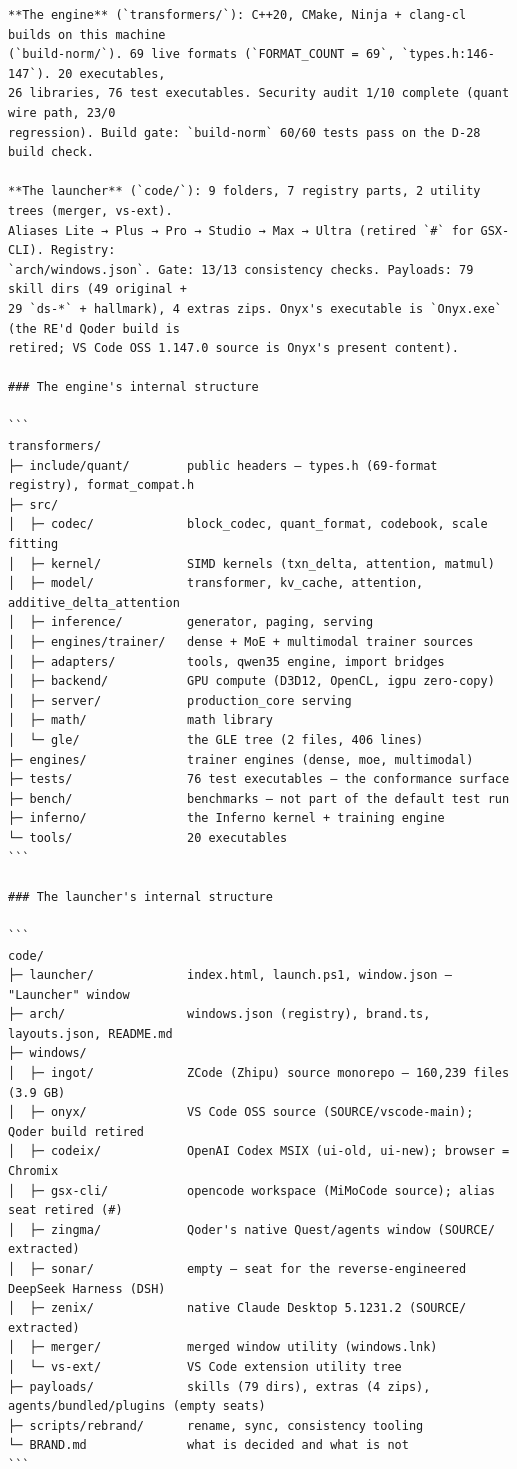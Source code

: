 \begin{Verbatim}[breaklines,breakanywhere,fontsize=\footnotesize]
**The engine** (`transformers/`): C++20, CMake, Ninja + clang-cl builds on this machine
(`build-norm/`). 69 live formats (`FORMAT_COUNT = 69`, `types.h:146-147`). 20 executables,
26 libraries, 76 test executables. Security audit 1/10 complete (quant wire path, 23/0
regression). Build gate: `build-norm` 60/60 tests pass on the D-28 build check.

**The launcher** (`code/`): 9 folders, 7 registry parts, 2 utility trees (merger, vs-ext).
Aliases Lite → Plus → Pro → Studio → Max → Ultra (retired `#` for GSX-CLI). Registry:
`arch/windows.json`. Gate: 13/13 consistency checks. Payloads: 79 skill dirs (49 original +
29 `ds-*` + hallmark), 4 extras zips. Onyx's executable is `Onyx.exe` (the RE'd Qoder build is
retired; VS Code OSS 1.147.0 source is Onyx's present content).

### The engine's internal structure

```
transformers/
├─ include/quant/        public headers — types.h (69-format registry), format_compat.h
├─ src/
│  ├─ codec/             block_codec, quant_format, codebook, scale fitting
│  ├─ kernel/            SIMD kernels (txn_delta, attention, matmul)
│  ├─ model/             transformer, kv_cache, attention, additive_delta_attention
│  ├─ inference/         generator, paging, serving
│  ├─ engines/trainer/   dense + MoE + multimodal trainer sources
│  ├─ adapters/          tools, qwen35 engine, import bridges
│  ├─ backend/           GPU compute (D3D12, OpenCL, igpu zero-copy)
│  ├─ server/            production_core serving
│  ├─ math/              math library
│  └─ gle/               the GLE tree (2 files, 406 lines)
├─ engines/              trainer engines (dense, moe, multimodal)
├─ tests/                76 test executables — the conformance surface
├─ bench/                benchmarks — not part of the default test run
├─ inferno/              the Inferno kernel + training engine
└─ tools/                20 executables
```

### The launcher's internal structure

```
code/
├─ launcher/             index.html, launch.ps1, window.json — "Launcher" window
├─ arch/                 windows.json (registry), brand.ts, layouts.json, README.md
├─ windows/
│  ├─ ingot/             ZCode (Zhipu) source monorepo — 160,239 files (3.9 GB)
│  ├─ onyx/              VS Code OSS source (SOURCE/vscode-main); Qoder build retired
│  ├─ codeix/            OpenAI Codex MSIX (ui-old, ui-new); browser = Chromix
│  ├─ gsx-cli/           opencode workspace (MiMoCode source); alias seat retired (#)
│  ├─ zingma/            Qoder's native Quest/agents window (SOURCE/ extracted)
│  ├─ sonar/             empty — seat for the reverse-engineered DeepSeek Harness (DSH)
│  ├─ zenix/             native Claude Desktop 5.1231.2 (SOURCE/ extracted)
│  ├─ merger/            merged window utility (windows.lnk)
│  └─ vs-ext/            VS Code extension utility tree
├─ payloads/             skills (79 dirs), extras (4 zips), agents/bundled/plugins (empty seats)
├─ scripts/rebrand/      rename, sync, consistency tooling
└─ BRAND.md              what is decided and what is not
```


\end{Verbatim}
